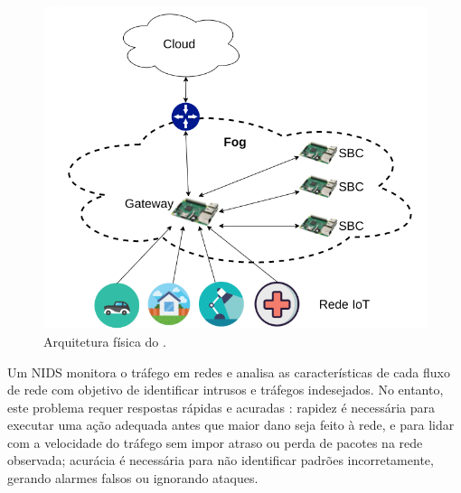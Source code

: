 

\begin{figure}[htb]
  \centerline{
    \includegraphics[width=0.6\linewidth,page=1]{figures/arq-mfog.png}
  }
  \caption{Arquitetura física do \mfog.}
  \label{fig:arq-fisica-mfog}
\end{figure}


Um \acf{NIDS} monitora o tráfego em redes e analisa as características de cada
fluxo de rede com objetivo de identificar intrusos e tráfegos indesejados.
No entanto, este problema requer respostas rápidas e acuradas \cite{DaCosta2019a}:
rapidez é necessária para executar uma ação adequada antes que
maior dano seja feito à rede, e para lidar com a velocidade do tráfego sem impor
atraso ou perda de pacotes na rede observada;
acurácia é necessária para não identificar padrões incorretamente, gerando
alarmes falsos ou ignorando ataques.


